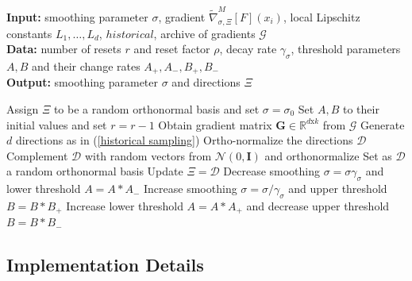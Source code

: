 \begin{algorithm}[!ht]
\caption{Parameter update}\label{ASHGFSubroutine}

\hspace*{\algorithmicindent} \textbf{Input:} smoothing parameter $\sigma$, gradient $ \widetilde{\nabla}_{\sigma, \Xi}^{M}[F](x_i)$, local Lipschitz constants $L_1,\dots,L_d$, $historical$, archive of gradients $\mathcal{G}$\\
\hspace*{\algorithmicindent} \textbf{Data:} number of resets $r$ and reset factor $\rho$, decay rate $\gamma_\sigma$, threshold parameters $A,B$ and their change rates $A_+, A_-, B_+, B_-$\\
\hspace*{\algorithmicindent} \textbf{Output:} smoothing parameter $\sigma$ and directions $\Xi$
\begin{algorithmic}[1]

    \State Assign $\Xi$ to be a random orthonormal basis and set $\sigma = \sigma_0$
    \State Set $A,B$ to their initial values and set $r = r-1$
\Else
        \State Obtain gradient matrix $\mathbf{G}\in\mathbb{R}^{d\text{x}k}$ from $\mathcal{G}$
        \State Generate $d$ directions as in (\ref{historical sampling})
        \State Ortho-normalize the directions $\mathcal{D}$
            \State Complement $\mathcal{D}$ with random vectors from $\mathcal{N}\left(0, \mathbf{I}\right)$ and orthonormalize
        \EndWhile
    \Else
        \State Set as $\mathcal{D}$ a random orthonormal basis
    \EndIf
    \State Update $\Xi = \mathcal{D}$
        \State Decrease smoothing $\sigma = \sigma \gamma_{\sigma}$ and lower threshold $A=A*A_-$
        \State Increase smoothing $\sigma = \sigma / \gamma_{\sigma}$ and upper threshold $B=B*B_+$
    \Else
        \State Increase lower threshold $A=A*A_+$ and decrease upper threshold $B=B*B_-$
    \EndIf
\EndIf

\end{algorithmic}
\end{algorithm}

\subsection{Implementation Details}

